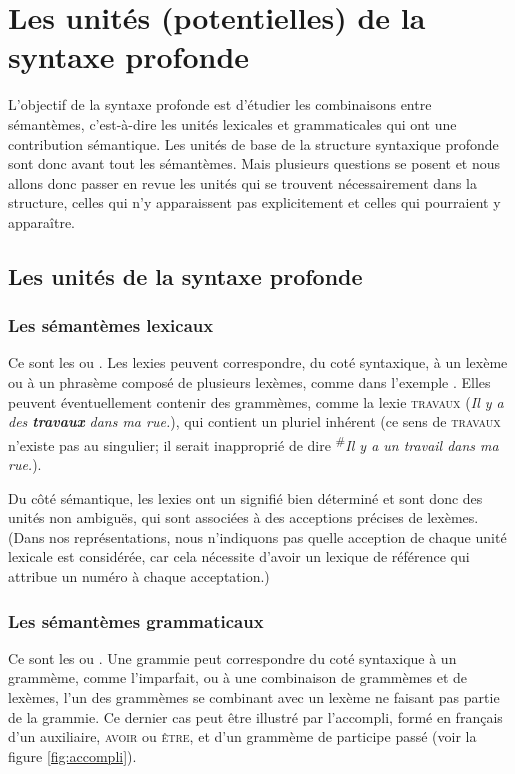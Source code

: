 \section{Les unités (potentielles) de la syntaxe profonde}
\label{sec:13-unites}
L’objectif de la syntaxe profonde est d’étudier les combinaisons entre sémantèmes, c’est-à-dire les unités lexicales et grammaticales qui ont une contribution sémantique. Les unités de base de la structure syntaxique profonde sont donc avant tout les sémantèmes. Mais plusieurs questions se posent et nous allons donc passer en revue les unités qui se trouvent nécessairement dans la structure, celles qui n’y apparaissent pas explicitement et celles qui pourraient y apparaître.

\subsection{Les unités de la syntaxe profonde}

\subsubsection{Les sémantèmes lexicaux} 
Ce sont les  ou . Les lexies peuvent correspondre, du coté syntaxique, à un lexème ou à un phrasème composé de plusieurs lexèmes, comme  dans l’exemple . Elles peuvent éventuellement contenir des grammèmes, comme la lexie \textsc{travaux} (\textit{Il y a des \textbf{travaux} dans ma rue.}), qui contient un pluriel inhérent (ce sens de \textsc{travaux} n'existe pas au singulier; il serait inapproprié de dire \textsuperscript{\#}\textit{Il y a un travail dans ma rue.}).

\begin{sloppypar}
Du côté sémantique, les lexies ont un signifié bien déterminé et sont donc des unités non ambiguës, qui sont associées à des acceptions précises de lexèmes. (Dans nos représentations, nous n’indiquons pas quelle acception de chaque unité lexicale est considérée, car cela nécessite d’avoir un lexique de référence qui attribue un numéro à chaque acceptation.)
\end{sloppypar}

\subsubsection{Les sémantèmes grammaticaux} 
\begin{sloppypar}
Ce sont les  ou . Une grammie peut correspondre du coté syntaxique à un grammème, comme l’imparfait, ou à une combinaison de grammèmes et de lexèmes, l’un des grammèmes se combinant avec un lexème ne faisant pas partie de la grammie. Ce dernier cas peut être illustré par l’accompli, formé en français d’un auxiliaire, \textsc{avoir} ou \textsc{être}, et d’un grammème de participe passé (voir la figure \ref{fig:accompli}).
\end{sloppypar}

